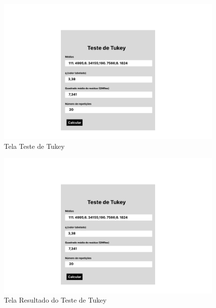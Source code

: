 \begin{figure}[H]
  \centering
  \includegraphics[width=0.8\linewidth]{Prototipo_Figma/tela1.png} 
  \caption{Tela Teste de Tukey}
  \label{fig:exemplo}
\end{figure}

\begin{figure}[H]
  \centering
  \includegraphics[width=0.8\linewidth]{Prototipo_Figma/tela1.png}
  \caption{Tela Resultado do Teste de Tukey}
  \label{fig:exemplo}
\end{figure}
